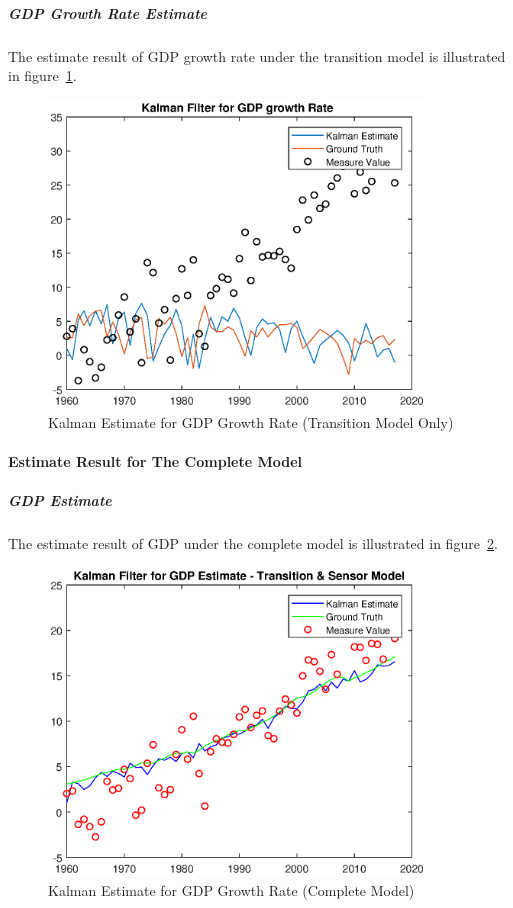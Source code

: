 \documentclass[11pt, a4paper]{article}
\begin{document}
\subparagraph{GDP Growth Rate Estimate}

The estimate result of GDP growth rate under the transition model is illustrated in figure~\ref{fig:kf6}.

\begin{figure}[htbp]
	
	\centering 
	\includegraphics[width=10cm]{kf_2_2}
	
	\caption{Kalman Estimate for GDP Growth Rate (Transition Model Only)}
	\label{fig:kf6}
	
\end{figure}

\paragraph{Estimate Result for The Complete Model}

\subparagraph{GDP Estimate}

The estimate result of GDP under the complete model is illustrated in figure~\ref{fig:kf7}.

\begin{figure}[htbp]
	
	\centering 
	\includegraphics[width=10cm]{kf_2_3}
	
	\caption{Kalman Estimate for GDP Growth Rate (Complete Model)}
	\label{fig:kf7}
	
\end{figure}
\end{document}
